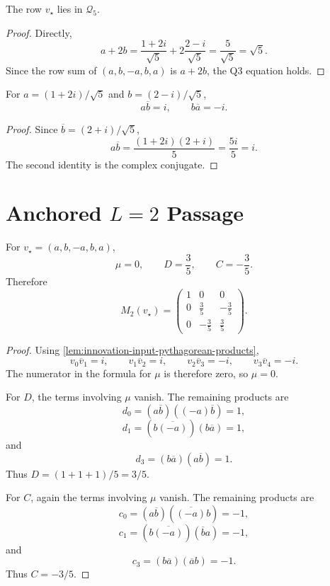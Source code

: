 \begin{theorem}
\label{thm:innovation-input-pythagorean-row-qthree}
The row $v_\star$ lies in $\mathcal Q_5$.
\end{theorem}

\begin{proof}
Directly,
$$
a+2b
=
\frac{1+2i}{\sqrt5}
+
2\frac{2-i}{\sqrt5}
=
\frac5{\sqrt5}
=
\sqrt5.
$$
Since the row sum of $(a,b,-a,b,a)$ is $a+2b$, the Q3 equation holds.
\end{proof}

\begin{lemma}
\label{lem:innovation-input-pythagorean-products}
For $a=(1+2i)/\sqrt5$ and $b=(2-i)/\sqrt5$,
$$
a\overline b=i,
\qquad
b\overline a=-i.
$$
\end{lemma}

\begin{proof}
Since $\overline b=(2+i)/\sqrt5$,
$$
a\overline b
=
\frac{(1+2i)(2+i)}5
=
\frac{5i}{5}
=
i.
$$
The second identity is the complex conjugate.
\end{proof}

\section{Anchored $L=2$ Passage}
\label{sec:innovation-input-pythagorean-ltwo-passage}

\begin{theorem}[Pythagorean anchored $L=2$ structure]
\label{thm:innovation-input-pythagorean-ltwo-structure}
For $v_\star=(a,b,-a,b,a)$,
$$
\mu=0,
\qquad
D=\frac35,
\qquad
C=-\frac35.
$$
Therefore
$$
M_2(v_\star)=
\left(
\begin{array}{ccc}
1 & 0 & 0\\
0 & \frac35 & -\frac35\\
0 & -\frac35 & \frac35
\end{array}
\right).
$$
\end{theorem}

\begin{proof}
Using \autoref{lem:innovation-input-pythagorean-products},
$$
v_0\overline v_1=i,
\qquad
v_1\overline v_2=i,
\qquad
v_2\overline v_3=-i,
\qquad
v_3\overline v_4=-i.
$$
The numerator in the formula for $\mu$ is therefore zero, so $\mu=0$.

For $D$, the terms involving $\mu$ vanish. The remaining products are
$$
d_0=(a\overline b)((-a)\overline b)=1,
$$
$$
d_1=(b\overline{(-a)})(b\overline a)=1,
$$
and
$$
d_3=(b\overline a)(a\overline b)=1.
$$
Thus $D=(1+1+1)/5=3/5$.

For $C$, again the terms involving $\mu$ vanish. The remaining products are
$$
c_0=(a\overline b)(\overline{(-a)}b)=-1,
$$
$$
c_1=(b\overline{(-a)})(\overline b a)=-1,
$$
and
$$
c_3=(b\overline a)(\overline a b)=-1.
$$
Thus $C=-3/5$.
\end{proof}

